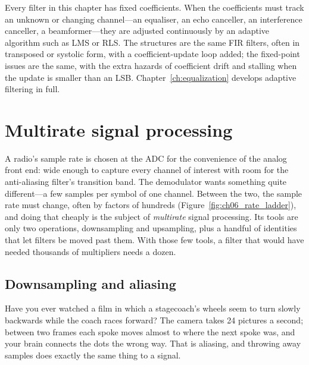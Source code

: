 Every filter in this chapter has fixed coefficients. When the coefficients must track an unknown or
changing channel---an equaliser, an echo canceller, an interference canceller, a beamformer---they
are adjusted continuously by an adaptive algorithm such as LMS or RLS. The structures are the same
FIR filters, often in transposed or systolic form, with a coefficient-update loop added; the
fixed-point issues are the same, with the extra hazards of coefficient drift and stalling when the
update is smaller than an LSB. Chapter~\ref{ch:equalization} develops adaptive filtering in full.

\section{Multirate signal processing}
\label{sec:ch06:multirate}

A radio's sample rate is chosen at the ADC for the convenience of the analog front end: wide enough
to capture every channel of interest with room for the anti-aliasing filter's transition band. The
demodulator wants something quite different---a few samples per symbol of one channel. Between the
two, the sample rate must change, often by factors of hundreds (Figure~\ref{fig:ch06_rate_ladder}),
and doing that cheaply is the subject of \emph{multirate} signal processing. Its tools are only two
operations, downsampling and upsampling, plus a handful of identities that let filters be moved past
them. With those few tools, a filter that would have needed thousands of multipliers needs a dozen.


\subsection{Downsampling and aliasing}

Have you ever watched a film in which a stagecoach's wheels seem to turn slowly backwards while the
coach races forward? The camera takes 24 pictures a second; between two frames each spoke moves almost
to where the next spoke was, and your brain connects the dots the wrong way. That is aliasing, and
throwing away samples does exactly the same thing to a signal.

